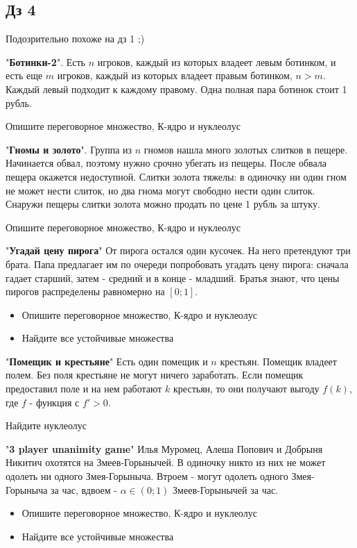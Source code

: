 \subsection{Дз 4}

Подозрительно похоже на дз 1 ;)

 "\textbf{Ботинки-2}". Есть $n$ игроков, каждый из которых владеет левым ботинком, и есть еще $m$ игроков, каждый из которых владеет правым ботинком, $n>m$. Каждый левый подходит к каждому правому. Одна полная пара ботинок стоит 1 рубль.  

Опишите переговорное множество, К-ядро и нуклеолус

 "\textbf{Гномы и золото}". Группа из $n$ гномов нашла много золотых слитков в пещере. Начинается обвал, поэтому нужно срочно убегать из пещеры. После обвала пещера окажется недоступной. Слитки золота тяжелы: в одиночку ни один гном не может нести слиток, но два гнома могут свободно нести один слиток. Снаружи пещеры слитки золота можно продать по цене 1 рубль за штуку. 

Опишите переговорное множество, К-ядро и нуклеолус

 "\textbf{Угадай цену пирога}"
От пирога остался один кусочек. На него претендуют три брата. Папа предлагает им по очереди попробовать угадать цену пирога: сначала гадает старший, затем - средний и в конце - младший. Братья знают, что цены пирогов распределены равномерно на $[0;1]$. 
\begin{itemize}
\item Опишите переговорное множество, К-ядро и нуклеолус
\item Найдите все устойчивые множества
\end{itemize}


 "\textbf{Помещик и крестьяне}"
Есть один помещик и $n$ крестьян. Помещик владеет полем. Без поля крестьяне не могут ничего заработать. Если помещик предоставил поле и на нем работают $k$ крестьян, то они получают выгоду $f(k)$, где $f$ - функция с $f'>0$. 

Найдите нуклеолус


 "\textbf{3 player unanimity game}"
Илья Муромец, Алеша Попович и Добрыня Никитич охотятся на Змеев-Горынычей. В одиночку никто из них не может одолеть ни одного Змея-Горыныча. Втроем - могут одолеть одного Змея-Горыныча за час, вдвоем - $\alpha\in (0;1)$ Змеев-Горынычей за час.

\begin{itemize}
\item Опишите переговорное множество, К-ядро и нуклеолус
\item Найдите все устойчивые множества
\end{itemize}

